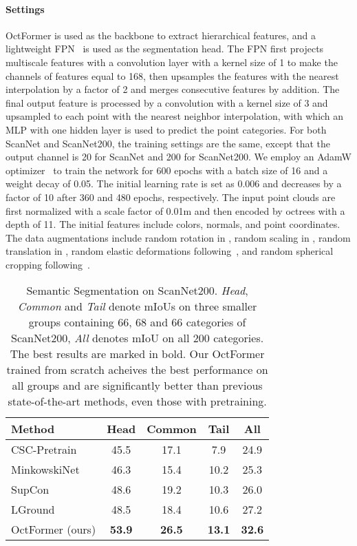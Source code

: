 \documentclass[acmtog,screen,authorversion]{acmart}
\newcommand{\tablestyle}[2]{\setlength{\tabcolsep}{#1}
                            \renewcommand{\arraystretch}{#2}
                            \centering
                            \footnotesize}
\begin{document}
\paragraph{Settings}
OctFormer is used as the backbone to extract hierarchical features, and a lightweight FPN~\cite{Lin2017} is used as the segmentation head.
The FPN first projects multiscale features with a convolution layer with a kernel size of 1 to make the channels of features equal to 168, then upsamples the features with the nearest interpolation by a factor of 2 and merges consecutive features by addition.
The final output feature is processed by a convolution with a kernel size of 3 and upsampled to each point with the nearest neighbor interpolation, with which
an MLP with one hidden layer is used to predict the point categories.
For both ScanNet and ScanNet200, the training settings are the same, except that the output channel is 20 for ScanNet and 200 for ScanNet200.
We employ an AdamW optimizer~\cite{Loshchilov2017} to train the network for 600 epochs with a batch size of 16 and a weight decay of 0.05.
The initial learning rate is set as 0.006 and decreases by a factor of 10 after 360 and 480 epochs, respectively.
The input point clouds are first normalized with a scale factor of 0.01m and then encoded by octrees with a depth of 11.
The initial features include colors, normals, and point coordinates.
The data augmentations include random rotation in , random scaling in , random translation in , random elastic deformations following~\cite{Choy2019}, and random spherical cropping following~\cite{Lai2022}.


\begin{table}[t]
\centering
\tablestyle{6pt}{1.1}
\caption{Semantic Segmentation on ScanNet200. \emph{Head}, \emph{Common} and \emph{Tail} denote mIoUs on three smaller groups containing 66, 68 and 66 categories of ScanNet200, \emph{All} denotes mIoU on all 200 categories. The best results are marked in bold. Our OctFormer trained from scratch acheives the best performance on all groups and are significantly better than previous state-of-the-art methods, even those with pretraining.}
\begin{tabular}{l|ccc|c}
  \toprule
  Method                           & Head       & Common     & Tail        & All       \\
  \midrule
  CSC-Pretrain~\cite{Hou2021}      & 45.5       & 17.1       & 7.9         & 24.9      \\
  MinkowskiNet~\cite{Choy2019}     & 46.3       & 15.4       & 10.2        & 25.3      \\
  SupCon~\cite{Khosla2020}         & 48.6       & 19.2       & 10.3        & 26.0      \\
  LGround~\cite{Rozen2022}         & 48.5       & 18.4       & 10.6        & 27.2      \\
  OctFormer (ours)                 & \bf{53.9}	& \bf{26.5}  & \bf{13.1}   & \bf{32.6} \\
  \bottomrule
\end{tabular}
\label{tab:scannet200}
\end{table}
 
\end{document}
